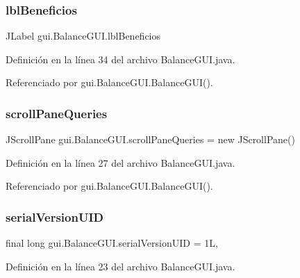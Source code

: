 \subsubsection{\texorpdfstring{lblBeneficios}{lblBeneficios}}
{\footnotesize\ttfamily J\+Label gui.\+Balance\+G\+U\+I.\+lbl\+Beneficios\hspace{0.3cm}{\ttfamily [private]}}



Definición en la línea 34 del archivo Balance\+G\+U\+I.\+java.



Referenciado por gui.\+Balance\+G\+U\+I.\+Balance\+G\+U\+I().

\mbox{\label{classgui_1_1BalanceGUI_aa87ad052970f55e24e0c1371fa4c2d12}} 
\subsubsection{\texorpdfstring{scrollPaneQueries}{scrollPaneQueries}}
{\footnotesize\ttfamily J\+Scroll\+Pane gui.\+Balance\+G\+U\+I.\+scroll\+Pane\+Queries = new J\+Scroll\+Pane()\hspace{0.3cm}{\ttfamily [private]}}



Definición en la línea 27 del archivo Balance\+G\+U\+I.\+java.



Referenciado por gui.\+Balance\+G\+U\+I.\+Balance\+G\+U\+I().

\mbox{\label{classgui_1_1BalanceGUI_a49301c8e84dee6e9ef6205a2df4a2482}} 
\subsubsection{\texorpdfstring{serialVersionUID}{serialVersionUID}}
{\footnotesize\ttfamily final long gui.\+Balance\+G\+U\+I.\+serial\+Version\+U\+ID = 1L\hspace{0.3cm}{\ttfamily [static]}, {\ttfamily [private]}}



Definición en la línea 23 del archivo Balance\+G\+U\+I.\+java.

